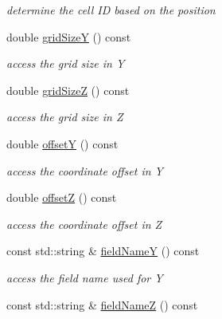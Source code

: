 \begin{DoxyCompactItemize}
\begin{DoxyCompactList}\small\item\em determine the cell ID based on the position \item\end{DoxyCompactList}\item 
double \hyperlink{class_d_d4hep_1_1_d_d_segmentation_1_1_cartesian_grid_y_z_a8dbaaa3750cd5604482fe52a7a1b68b3}{gridSizeY} () const 
\begin{DoxyCompactList}\small\item\em access the grid size in Y \item\end{DoxyCompactList}\item 
double \hyperlink{class_d_d4hep_1_1_d_d_segmentation_1_1_cartesian_grid_y_z_a6d22aee2e00a3509e9e018c84fc53ae7}{gridSizeZ} () const 
\begin{DoxyCompactList}\small\item\em access the grid size in Z \item\end{DoxyCompactList}\item 
double \hyperlink{class_d_d4hep_1_1_d_d_segmentation_1_1_cartesian_grid_y_z_aedee5c37ad16dbccc417e158c6c4d581}{offsetY} () const 
\begin{DoxyCompactList}\small\item\em access the coordinate offset in Y \item\end{DoxyCompactList}\item 
double \hyperlink{class_d_d4hep_1_1_d_d_segmentation_1_1_cartesian_grid_y_z_a1e1a08a4a611d7cb799e2e6240bb06a4}{offsetZ} () const 
\begin{DoxyCompactList}\small\item\em access the coordinate offset in Z \item\end{DoxyCompactList}\item 
const std::string \& \hyperlink{class_d_d4hep_1_1_d_d_segmentation_1_1_cartesian_grid_y_z_a93cbfb2eb17360ed72480d24367b4bc8}{fieldNameY} () const 
\begin{DoxyCompactList}\small\item\em access the field name used for Y \item\end{DoxyCompactList}\item 
const std::string \& \hyperlink{class_d_d4hep_1_1_d_d_segmentation_1_1_cartesian_grid_y_z_a952f9cd6d85ca88d3e357d8b367b1858}{fieldNameZ} () const 

\end{DoxyCompactItemize}
